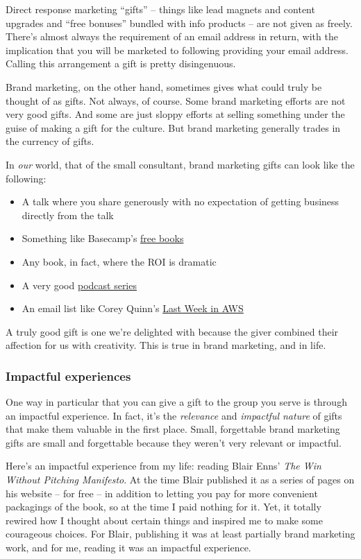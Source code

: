 \documentclass[13pt,]{tufte-handout}
\providecommand{\tightlist}{%
  \setlength{\itemsep}{0pt}\setlength{\parskip}{0pt}}
\begin{document}
Direct response marketing ``gifts'' -- things like lead magnets and
content upgrades and ``free bonuses'' bundled with info products -- are
not given as freely. There's almost always the requirement of an email
address in return, with the implication that you will be marketed to
following providing your email address. Calling this arrangement a gift
is pretty disingenuous.

Brand marketing, on the other hand, sometimes gives what could truly be
thought of as gifts. Not always, of course. Some brand marketing efforts
are not very good gifts. And some are just sloppy efforts at selling
something under the guise of making a gift for the culture. But brand
marketing generally trades in the currency of gifts.

In \emph{our} world, that of the small consultant, brand marketing gifts
can look like the following:

\begin{itemize}
\tightlist
\item
  A talk where you share generously with no expectation of getting
  business directly from the talk
\item
  Something like Basecamp's \href{https://basecamp.com/books}{free
  books}
\item
  Any book, in fact, where the ROI is dramatic
\item
  A very good \href{https://2bobs.com}{podcast series}
\item
  An email list like Corey Quinn's
  \href{https://www.lastweekinaws.com}{Last Week in AWS}
\end{itemize}

A truly good gift is one we're delighted with because the giver combined
their affection for us with creativity. This is true in brand marketing,
and in life.

\hypertarget{impactful-experiences}{%
\subsubsection{Impactful experiences}\label{impactful-experiences}}

One way in particular that you can give a gift to the group you serve is
through an impactful experience. In fact, it's the \emph{relevance} and
\emph{impactful nature} of gifts that make them valuable in the first
place. Small, forgettable brand marketing gifts are small and
forgettable because they weren't very relevant or impactful.

Here's an impactful experience from my life: reading Blair Enns'
\emph{The Win Without Pitching Manifesto}. At the time Blair published
it as a series of pages on his website -- for free -- in addition to
letting you pay for more convenient packagings of the book, so at the
time I paid nothing for it. Yet, it totally rewired how I thought about
certain things and inspired me to make some courageous choices. For
Blair, publishing it was at least partially brand marketing work, and
for me, reading it was an impactful experience.
\end{document}

